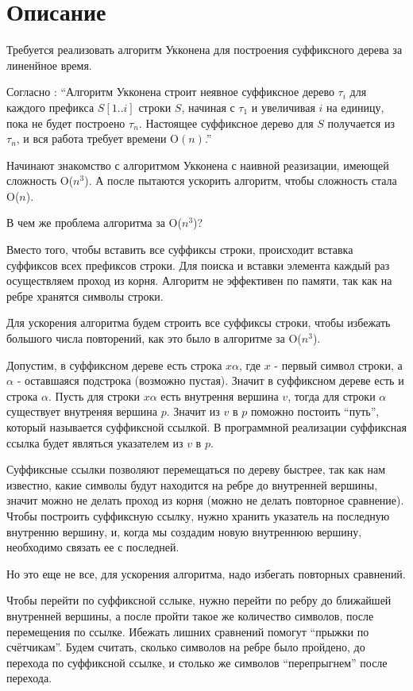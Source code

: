 \section{Описание}

Требуется реализовать алгоритм Укконена для построения суффиксного дерева за линенйное время.


Согласно \cite{Gasfild}: \enquote{Алгоритм Укконена строит неявное суффиксное дерево $\tau_i$ для каждого префикса $S[1..i]$ строки $S$, 
начиная с $\tau_1$ и увеличивая $i$ на единицу, пока не будет построено $\tau_n$. 
Настоящее суффиксное дерево для $S$ получается из $\tau_n$, и вся работа требует времени O$(n)$.}

Начинают знакомство с алгоритмом Укконена с наивной реазизации, имеющей сложность O($n^3$). А после пытаются ускорить алгоритм,
чтобы сложность стала O($n$).

В чем же проблема алгоритма за O($n^3$)? 

Вместо того, чтобы вставить все суффиксы строки, происходит вставка суффиксов всех префиксов строки.
Для поиска и вставки элемента каждый раз осуществляем проход из корня. Алгоритм не эффективен по памяти, 
так как на ребре хранятся символы строки.

Для ускорения алгоритма будем строить все суффиксы строки, чтобы избежать большого числа повторений, 
как это было в алгоритме за O($n^3$).

Допустим, в суффиксном дереве есть строка $x\alpha$, где $x$ - первый символ строки, 
а $\alpha$ - оставшаяся подстрока (возможно пустая). Значит в суффиксном дереве есть и строка $\alpha$. 
Пусть для строки $x\alpha$ есть внутрення вершина $v$, тогда для строки $\alpha$ существует внутреняя вершина $p$.
Значит из $v$ в $p$ поможно постоить \enquote{путь}, который называется суффиксной ссылкой. В программной реализации суффиксная ссылка
будет являться указателем из $v$ в $p$.

Суффиксные ссылки позволяют перемещаться по дереву быстрее, так как нам известно, 
какие символы будут находится на ребре до внутренней вершины, значит можно не делать проход из корня (можно не делать повторное сравнение). 
Чтобы построить суффиксную ссылку, нужно хранить указатель на последную внутренню вершину, и, 
когда мы создадим новую внутреннюю вершину, необходимо связать ее с последней.

Но это еще не все, для ускорения алгоритма, надо избегать повторных сравнений.

Чтобы перейти по суффиксной сслыке, нужно перейти по ребру до ближайшей внутренней вершины, а после пройти такое же количество 
символов, после перемещения по ссылке. Ибежать лишних сравнений помогут \enquote{прыжки по счётчикам}. Будем считать, сколько символов на ребре 
было пройдено, до перехода по суффиксной ссылке, и столько же символов \enquote{перепрыгнем} после перехода.

